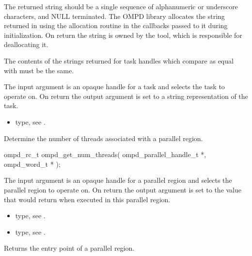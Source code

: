 \descr
The returned string should be a single sequence of alphanumeric or underscore characters, and 
NULL terminated. The OMPD library allocates the string returned in 
using the allocation routine in the callbacks passed to it during initialization. On return the string is 
owned by the tool, which is responsible for deallocating it.

The contents of the strings returned for task handles which compare as equal with
 must be the same.

\argdesc
The input argument  is an opaque handle for a task and selects the task to operate on.
On return the output argument  is set to a string representation of the task.

\crossreferences
\begin{itemize}
	\item {} type, see .
\end{itemize}



\label{subsubsubsec:ompd_get_num_threads}
\summary
Determine the number of threads associated with a parallel region.

\format
\begin{cspecific}
\begin{ompSyntax}
ompd_rc_t ompd_get_num_threads(
  ompd_parallel_handle_t *,
  ompd_word_t *
);
\end{ompSyntax}
\end{cspecific}

\descr

\argdesc
The input argument  is an opaque handle for a parallel region and selects the parallel region to operate on.
On return the output argument  is set to the value that  would return when
executed in this parallel region.

\crossreferences
\begin{itemize}
	\item {} type, see .
	\item {} type, see .
\end{itemize}

\label{subsubsubsec:ompd_get_parallel_function}
\summary
Returns the entry point of a parallel region.

